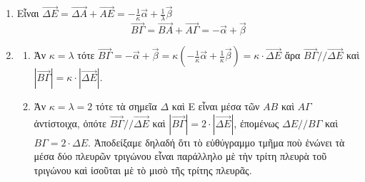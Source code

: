 \begin{enumerate}[label=\alph*)]
    \item Εἶναι $ \vec{\Delta E} = \vec{\Delta A} + \vec{A E} = -\frac{1}{\kappa} \vec{\alpha} + \frac{1}{\lambda} \vec{\beta} $
    \[ \vec{B \Gamma} = \vec{B A} + \vec{A \Gamma} = -\vec{\alpha} + \vec{\beta} \]
    \item
    \begin{enumerate}[label=\roman*)]
        \item Ἀν $\kappa=\lambda$ τότε $ \vec{B \Gamma} = -\vec{\alpha} + \vec{\beta} = \kappa \left(-\frac{1}{\kappa} \vec{\alpha} + \frac{1}{\kappa} \vec{\beta} \right) = \kappa \cdot \vec{\Delta E} $
        ἄρα $ \vec{B \Gamma} // \vec{\Delta E} $ καὶ $ \left|\vec{B \Gamma}\right| = \kappa \cdot \left|\vec{\Delta E}\right| $.
        \item Ἀν $\kappa=\lambda=2$ τότε τὰ σημεῖα $\Delta$ καὶ E εἶναι μέσα τῶν $AB$ καὶ $A \Gamma$ ἀντίστοιχα, ὀπότε $ \vec{B \Gamma} // \vec{\Delta E} $ καὶ $ \left|\vec{B \Gamma}\right| = 2 \cdot \left|\vec{\Delta E}\right| $, ἐπομένως $\Delta E // B \Gamma$ καὶ $B \Gamma = 2 \cdot \Delta E$.
        Ἀποδείξαμε δηλαδή ὅτι τὸ εὐθύγραμμο τμῆμα ποὺ ἑνώνει τὰ μέσα δύο πλευρῶν τριγώνου εἶναι παράλληλο μὲ τὴν τρίτη πλευρὰ τοῦ τριγώνου καὶ ἰσοῦται μὲ τὸ μισὸ τῆς τρίτης πλευρᾶς.
    \end{enumerate}
\end{enumerate}